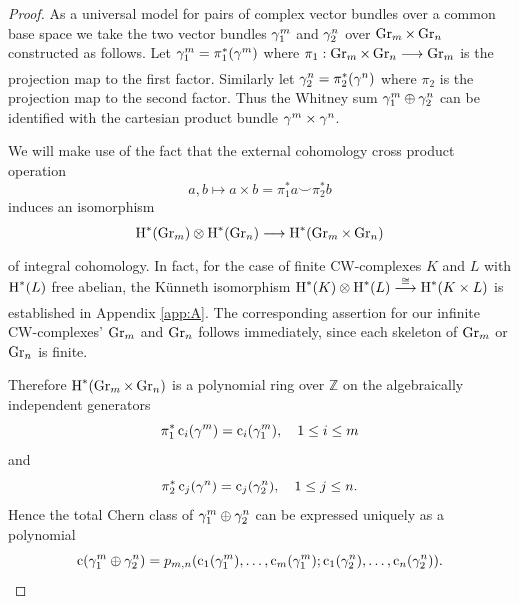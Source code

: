 \documentclass[../main]{subfiles}
\begin{document}
\begin{proof} As a universal model for pairs of complex vector bundles over a common base space we take the two vector bundles $\gamma_{1}^{m}$ and $\gamma_{2}^{n}$ over $\operatorname{Gr}_{m} \times \operatorname{Gr}_{n}$ constructed as follows. Let $\gamma_{1}^{m}=\pi_{1}^{*}(\gamma^{m})$ where $\pi_{1}: \grassmannian_{m} \times \grassmannian_{n} \varrightarrow{} \grassmannian_{m}$ is the projection map to the first factor. Similarly let $\gamma_{2}^{n}=\pi_{2}^{*}(\gamma^{n})$ where $\pi_{2}$ is the projection map to the second factor. Thus the Whitney sum $\gamma_{1}^{m} \oplus \gamma_{2}^{n}$ can be identified with the cartesian product bundle $\gamma^{m} \times \gamma^{n}$.

We will make use of the fact that the external cohomology cross product operation
\[
a, b \mapsto a \times b=\pi_{1}^{*} a \smile \pi_{2}^{*} b
\]
induces an isomorphism
\[
\homology^{*}(\grassmannian_{m}) \otimes \homology^{*}(\grassmannian_{n}) \varrightarrow{} \homology^{*}(\grassmannian_{m} \times \grassmannian_{n})
\]
of integral cohomology. In fact, for the case of finite CW-complexes $K$ and $L$ with $\operatorname{H}^{*}(L)$ free abelian, the Künneth isomorphism $\homology^{*}(K) \otimes \homology^{*}(L)\varrightarrow{\cong} \homology^{*}(K \times L)$ is established in Appendix \ref{app:A}. The corresponding assertion for our infinite CW-complexes' $\operatorname{Gr}_{m}$ and $\operatorname{Gr}_{n}$ follows immediately, since each skeleton of $\operatorname{Gr}_{m}$ or $\operatorname{Gr}_{n}$ is finite.

Therefore $\operatorname{H}^{*}(\operatorname{Gr}_{m} \times \operatorname{Gr}_{n})$ is a polynomial ring over $\mathbb{Z}$ on the algebraically independent generators
\[
\pi_{1}^{*} \operatorname{c}_{i}(\gamma^{m})=\operatorname{c}_{i}(\gamma_{1}^{m}), \quad 1 \leq i \leq m
\]
and
\[
\pi_{2}^{*} \operatorname{c}_{j}(\gamma^{n})=\operatorname{c}_{j}(\gamma_{2}^{n}), \quad 1 \leq j \leq n .
\]
Hence the total Chern class of $\gamma_{1}^{m} \oplus \gamma_{2}^{n}$ can be expressed uniquely as a polynomial
\[
\operatorname{c}(\gamma_{1}^{m} \oplus \gamma_{2}^{n})=p_{m, n}(\operatorname{c}_{1}(\gamma_{1}^{m}), \ldots, \operatorname{c}_{m}(\gamma_{1}^{m}) ; \operatorname{c}_{1}(\gamma_{2}^{n}), \ldots, \operatorname{c}_{n}(\gamma_{2}^{n})) .
\]


\end{proof}
\end{document}
